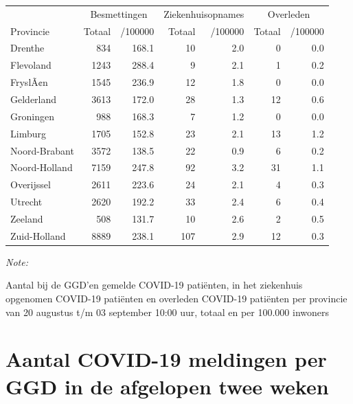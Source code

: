 \documentclass[
  english,
  man,floatsintext]{apa6}
\begin{document}
\begin{table}
\centering
\begin{threeparttable}
\begin{tabular}{lrrrrrr}
\toprule
\multicolumn{1}{c}{ } & \multicolumn{2}{c}{Besmettingen} & \multicolumn{2}{c}{Ziekenhuisopnames} & \multicolumn{2}{c}{Overleden} \\
\cmidrule(l{3pt}r{3pt}){2-3} \cmidrule(l{3pt}r{3pt}){4-5} \cmidrule(l{3pt}r{3pt}){6-7}
Provincie & Totaal & /100000 & Totaal & /100000 & Totaal & /100000\\
\midrule
Drenthe & 834 & 168.1 & 10 & 2.0 & 0 & 0.0\\
Flevoland & 1243 & 288.4 & 9 & 2.1 & 1 & 0.2\\
FryslÃ¢n & 1545 & 236.9 & 12 & 1.8 & 0 & 0.0\\
Gelderland & 3613 & 172.0 & 28 & 1.3 & 12 & 0.6\\
Groningen & 988 & 168.3 & 7 & 1.2 & 0 & 0.0\\
Limburg & 1705 & 152.8 & 23 & 2.1 & 13 & 1.2\\
Noord-Brabant & 3572 & 138.5 & 22 & 0.9 & 6 & 0.2\\
Noord-Holland & 7159 & 247.8 & 92 & 3.2 & 31 & 1.1\\
Overijssel & 2611 & 223.6 & 24 & 2.1 & 4 & 0.3\\
Utrecht & 2620 & 192.2 & 33 & 2.4 & 6 & 0.4\\
Zeeland & 508 & 131.7 & 10 & 2.6 & 2 & 0.5\\
Zuid-Holland & 8889 & 238.1 & 107 & 2.9 & 12 & 0.3\\
\bottomrule
\end{tabular}
\begin{tablenotes}
\item \textit{Note: } 
\item Aantal bij de GGD’en gemelde COVID-19 patiënten, in het ziekenhuis opgenomen COVID-19 patiënten en overleden COVID-19 patiënten per provincie van 20 augustus t/m 03 september 10:00 uur, totaal en per 100.000 inwoners
\end{tablenotes}
\end{threeparttable}
\end{table}

\newpage

\hypertarget{aantal-covid-19-meldingen-per-ggd-in-de-afgelopen-twee-weken}{%
\section{Aantal COVID-19 meldingen per GGD in de afgelopen twee weken}\label{aantal-covid-19-meldingen-per-ggd-in-de-afgelopen-twee-weken}}
\end{document}
